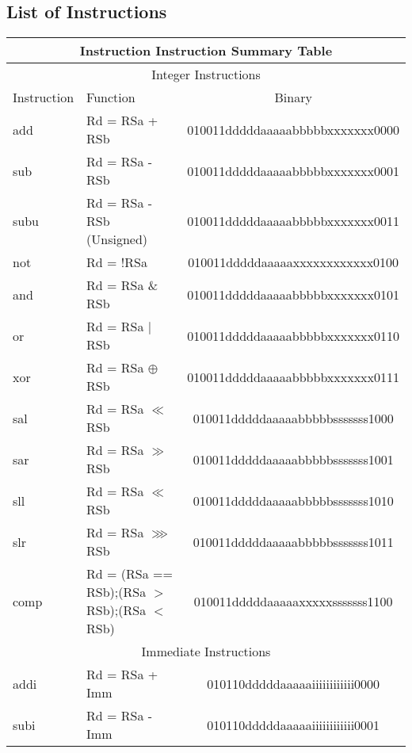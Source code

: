 \documentclass[letterpaper, 11pt]{article}
\begin{document}
\subsection{List of Instructions}

	\begin{center}
		\begin{longtable}{|l|l|c|}
			\multicolumn{3}{c}{Instruction Instruction Summary Table} \\ \hline
			\multicolumn{3}{|c|}{Integer Instructions} \\ \hline
			Instruction & Function 										& Binary \\ \hline
			add			& Rd = RSa + RSb 								& 010011dddddaaaaabbbbbxxxxxxx0000 \\
			sub			& Rd = RSa - RSb 								& 010011dddddaaaaabbbbbxxxxxxx0001 \\
			subu		& Rd = RSa - RSb (Unsigned)					 	& 010011dddddaaaaabbbbbxxxxxxx0011 \\
			not			& Rd = !RSa	 									& 010011dddddaaaaaxxxxxxxxxxxx0100 \\
			and			& Rd = RSa \& RSb								& 010011dddddaaaaabbbbbxxxxxxx0101 \\
			or			& Rd = RSa $|$ RSb 								& 010011dddddaaaaabbbbbxxxxxxx0110 \\
			xor			& Rd = RSa $\oplus$ RSb 						& 010011dddddaaaaabbbbbxxxxxxx0111 \\
			sal			& Rd = RSa $\ll$ RSb 							& 010011dddddaaaaabbbbbsssssss1000 \\
			sar			& Rd = RSa $\gg$ RSb 							& 010011dddddaaaaabbbbbsssssss1001 \\
			sll			& Rd = RSa $\ll$ RSb 							& 010011dddddaaaaabbbbbsssssss1010 \\
			slr			& Rd = RSa $ \ggg  $ RSb 						& 010011dddddaaaaabbbbbsssssss1011 \\
			comp		& Rd = (RSa == RSb);(RSa $>$ RSb);(RSa $<$ RSb)	& 010011dddddaaaaaxxxxxsssssss1100 \\
			\hline
			\multicolumn{3}{|c|}{Immediate Instructions} \\ \hline
			addi		& Rd = RSa + Imm 								& 010110dddddaaaaaiiiiiiiiiiii0000 \\
			subi		& Rd = RSa - Imm 								& 010110dddddaaaaaiiiiiiiiiiii0001 \\

\end{longtable}
\end{center}
\end{document}
